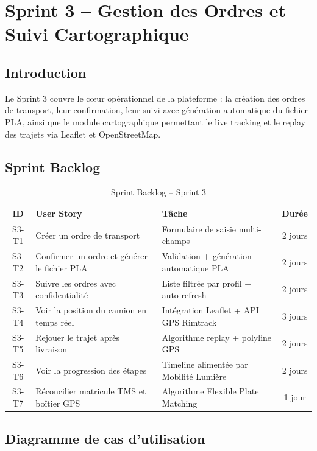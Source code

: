 \documentclass[12pt,a4paper,oneside]{report}
\begin{document}
\chapter{Sprint 3 -- Gestion des Ordres et Suivi Cartographique}

\section{Introduction}
Le Sprint 3 couvre le cœur opérationnel de la plateforme : la création des ordres de transport, leur confirmation, leur suivi avec génération automatique du fichier PLA, ainsi que le module cartographique permettant le live tracking et le replay des trajets via Leaflet et OpenStreetMap.

\section{Sprint Backlog}

\begin{table}[H]
\centering
\caption{Sprint Backlog -- Sprint 3}
\begin{tabular}{|c|p{4.2cm}|p{5.2cm}|c|}
\hline
\textbf{ID} & \textbf{User Story} & \textbf{Tâche} & \textbf{Durée} \\
\hline
S3-T1 & Créer un ordre de transport & Formulaire de saisie multi-champs & 2 jours \\
\hline
S3-T2 & Confirmer un ordre et générer le fichier PLA & Validation + génération automatique PLA & 2 jours \\
\hline
S3-T3 & Suivre les ordres avec confidentialité & Liste filtrée par profil + auto-refresh & 2 jours \\
\hline
S3-T4 & Voir la position du camion en temps réel & Intégration Leaflet + API GPS Rimtrack & 3 jours \\
\hline
S3-T5 & Rejouer le trajet après livraison & Algorithme replay + polyline GPS & 2 jours \\
\hline
S3-T6 & Voir la progression des étapes & Timeline alimentée par Mobilité Lumière & 2 jours \\
\hline
S3-T7 & Réconcilier matricule TMS et boîtier GPS & Algorithme Flexible Plate Matching & 1 jour \\
\hline
\end{tabular}
\end{table}

\section{Diagramme de cas d'utilisation}
\end{document}
